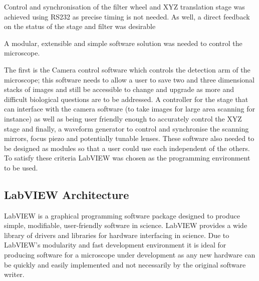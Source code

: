 Control and synchronisation of the filter wheel and XYZ translation stage was achieved using RS232 as precise timing is not needed.
As well, a direct feedback on the status of the stage and filter was desirable %


%



A modular, extensible and simple software solution was needed to control the microscope.

The first is the Camera control software which controls the detection arm of the microscope; this software needs to allow a user to save two and three dimensional stacks of images and still be accessible to change and upgrade as more and difficult biological questions are to be addressed.
A controller for the stage that can interface with the camera software (to take images for large area scanning for instance) as well as being user friendly enough to accurately control the XYZ stage and finally, a waveform generator to control and synchronise the scanning mirrors, focus piezo and potentially tunable lenses.
These software also needed to be designed as modules so that a user could use each independent of the others.
To satisfy these criteria LabVIEW was chosen as the programming environment to be used.

\subsection{LabVIEW Architecture}

LabVIEW is a graphical programming software package designed to produce simple, modifiable, user-friendly software in science.
LabVIEW provides a wide library of drivers and libraries for hardware interfacing in science.
Due to LabVIEW's modularity and fast development environment it is ideal for producing software for a microscope under development as any new hardware can be quickly and easily implemented and not necessarily by the original software writer.

